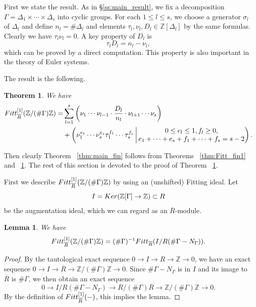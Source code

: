 \documentclass[11pt]{article}
\newtheorem{lemm}[theo]{Lemma}
\newtheorem{thm}[theo]{Theorem}
\theoremstyle{definition}
\numberwithin{equation}{section}
\newcommand{\Z}{\mathbb{Z}}
\newcommand{\ol}[1]{\overline{#1}}
\newcommand{\Ker}{{\rm Ker}}
\newcommand{\Fitt}{{\rm Fitt}}
\begin{document}
First we state the result.
As in \S\ref{ss:main_result}, we fix a decomposition $\Gamma = \Delta_1 \times \cdots \times \Delta_s$ into cyclic groups.
For each $1 \leq l \leq s$, we choose a generator $\sigma_l$ of $\Delta_l$ and define $n_l = \# \Delta_l$ and elements $\tau_l, \nu_l, D_l \in \Z[\Delta_l]$ by the same formulas.
Clearly we have $\tau_l \nu_l = 0$.
A key property of $D_l$ is 
\begin{equation}\label{eq:D_key}
\tau_l D_l = n_l - \nu_l,
\end{equation}
which can be proved by a direct computation.
This property is also important in the theory of Euler systems.

The result is the following.

\begin{thm}\label{thm:Fitt_fin}
We have
\begin{align}
\Fitt^{[1]}_{\ol{R}}(\Z/ (\#\Gamma) \Z)
= & \sum_{l=1}^s \left( \nu_1 \cdots \nu_{l-1} \cdot \frac{D_l}{n_l} \cdot \nu_{l+1} \cdots \nu_s \right) \\
& + \left(\nu_1^{e_1} \cdots \nu_s^{e_s} \tau_1^{f_1} \cdots \tau_s^{f_s} \, \middle| \, \begin{matrix} 0 \leq e_l \leq 1, f_l \geq 0, \\ e_1 + \cdots + e_s + f_1 + \cdots + f_s = s- 2 \end{matrix} \right).
\end{align}
\end{thm}

Then clearly Theorem ~\ref{thm:main_fin} follows from Theorems ~\ref{thm:Fitt_fin1} and ~\ref{thm:Fitt_fin}.
The rest of this section is devoted to the proof of Theorem ~\ref{thm:Fitt_fin}.

First we describe $\Fitt^{[1]}_{\ol{R}}(\Z/ (\#\Gamma) \Z)$ by using an (unshifted) Fitting ideal.
Let 
\[
I = \Ker(\Z[\Gamma] \to \Z) \subset R
\]
 be the augmentation ideal, which we can regard as an $\ol{R}$-module.

\begin{lemm}\label{lem:Fitt1}
We have
\[
\Fitt^{[1]}_{\ol{R}}(\Z/ (\#\Gamma) \Z) 
 = (\# \Gamma)^{-1} \Fitt_{\ol{R}}(I/R(\# \Gamma - N_{\Gamma})).
\]
\end{lemm}

\begin{proof}
By the tautological exact sequence $0 \to I \to R \to \Z \to 0$, we have an exact sequence $0 \to I \to \ol{R} \to \Z/(\# \Gamma)\Z \to 0$.
Since $\# \Gamma - N_{\Gamma}$ is in $I$ and its image to $\ol{R}$ is $\# \Gamma$, we then obtain an exact sequence
\[
0 \to I/R (\# \Gamma - N_{\Gamma}) \to \ol{R}/ (\# \Gamma) \ol{R} \to \Z/(\# \Gamma)\Z \to 0.
\]
By the definition of $\Fitt_{\ol{R}}^{[1]}(-)$, this implies the lemma.
\end{proof}
\end{document}
